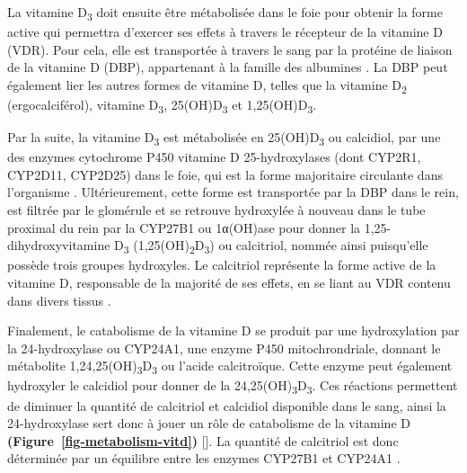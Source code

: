 \documentclass[
  letterpaper,
  DIV=11,
  numbers=noendperiod]{scrartcl}
\begin{document}
La vitamine D\textsubscript{3} doit ensuite être métabolisée dans le
foie pour obtenir la forme active qui permettra d'exercer ses effets à
travers le récepteur de la vitamine D (VDR). Pour cela, elle est
transportée à travers le sang par la protéine de liaison de la vitamine
D (DBP), appartenant à la famille des albumines
\autocite{Christakos.2010,Chun.2012}. La DBP peut également lier les
autres formes de vitamine D, telles que la vitamine D\textsubscript{2}
(ergocalciférol), vitamine D\textsubscript{3}, 25(OH)D\textsubscript{3}
et 1,25(OH)D\textsubscript{3}.

Par la suite, la vitamine D\textsubscript{3} est métabolisée en
25(OH)D\textsubscript{3} ou calcidiol, par une des enzymes cytochrome
P450 vitamine D 25-hydroxylases (dont CYP2R1, CYP2D11, CYP2D25) dans le
foie, qui est la forme majoritaire circulante dans l'organisme
\autocite{Norman.2008,Christakos.2010}. Ultérieurement, cette forme est
transportée par la DBP dans le rein, est filtrée par le glomérule et se
retrouve hydroxylée à nouveau dans le tube proximal du rein par la
CYP27B1 ou 1α(OH)ase pour donner la 1,25-dihydroxyvitamine
D\textsubscript{3} (1,25(OH)\textsubscript{2}D\textsubscript{3}) ou
calcitriol, nommée ainsi puisqu'elle possède trois groupes hydroxyles.
Le calcitriol représente la forme active de la vitamine D, responsable
de la majorité de ses effets, en se liant au VDR contenu dans divers
tissus \autocite{Norman.2008,Dankers.2017}.

Finalement, le catabolisme de la vitamine D se produit par une
hydroxylation par la 24-hydroxylase ou CYP24A1, une enzyme P450
mitochrondriale, donnant le métabolite
1,24,25(OH)\textsubscript{3}D\textsubscript{3} ou l'acide calcitroïque.
Cette enzyme peut également hydroxyler le calcidiol pour donner de la
24,25(OH)\textsubscript{3}D\textsubscript{3}. Ces réactions permettent
de diminuer la quantité de calcitriol et calcidiol disponible dans le
sang, ainsi la 24-hydroxylase sert donc à jouer un rôle de catabolisme
de la vitamine D \textbf{(Figure~\ref{fig-metabolism-vitd})}
{[}\textcite{Norman.2008}{]}. La quantité de calcitriol est donc
déterminée par un équilibre entre les enzymes CYP27B1 et CYP24A1
\autocite{Dankers.2017}.
\end{document}
